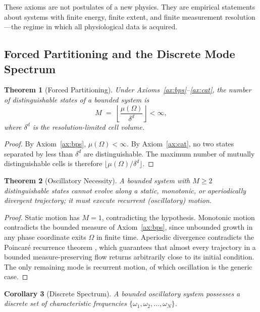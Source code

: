 \documentclass[11pt,twocolumn,a4paper]{article}
\newtheorem{theorem}{Theorem}[section]
\newtheorem{corollary}[theorem]{Corollary}
\theoremstyle{definition}
\theoremstyle{remark}
\begin{document}
These axioms are not postulates of a new physics. They are
empirical statements about systems with finite energy, finite extent,
and finite measurement resolution---the regime in which all
physiological data is acquired.

\subsection{Forced Partitioning and the Discrete Mode Spectrum}

\begin{theorem}[Forced Partitioning]
\label{thm:forced-partition}
Under Axioms~\ref{ax:bps}--\ref{ax:cat}, the number of distinguishable
states of a bounded system is
\begin{equation}
M \;=\; \left\lfloor \frac{\mu(\Omega)}{\delta^d} \right\rfloor < \infty,
\end{equation}
where $\delta^d$ is the resolution-limited cell volume.
\end{theorem}

\begin{proof}
By Axiom~\ref{ax:bps}, $\mu(\Omega) < \infty$. By Axiom~\ref{ax:cat},
no two states separated by less than $\delta^d$ are distinguishable.
The maximum number of mutually distinguishable cells is therefore
$\lfloor \mu(\Omega)/\delta^d \rfloor$.
\end{proof}

\begin{theorem}[Oscillatory Necessity]
\label{thm:oscillatory}
A bounded system with $M \geq 2$ distinguishable states cannot
evolve along a static, monotonic, or aperiodically divergent
trajectory; it must execute recurrent (oscillatory) motion.
\end{theorem}

\begin{proof}
Static motion has $M = 1$, contradicting the hypothesis. Monotonic
motion contradicts the bounded measure of Axiom~\ref{ax:bps}, since
unbounded growth in any phase coordinate exits $\Omega$ in finite
time. Aperiodic divergence contradicts the Poincar{\'e} recurrence
theorem \citep{poincare1890}, which guarantees that almost every
trajectory in a bounded measure-preserving flow returns arbitrarily
close to its initial condition. The only remaining mode is recurrent
motion, of which oscillation is the generic case.
\end{proof}

\begin{corollary}[Discrete Spectrum]
\label{cor:discrete-spectrum}
A bounded oscillatory system possesses a discrete set of
characteristic frequencies $\{\omega_1, \omega_2, \ldots, \omega_N\}$.
\end{corollary}
\end{document}
